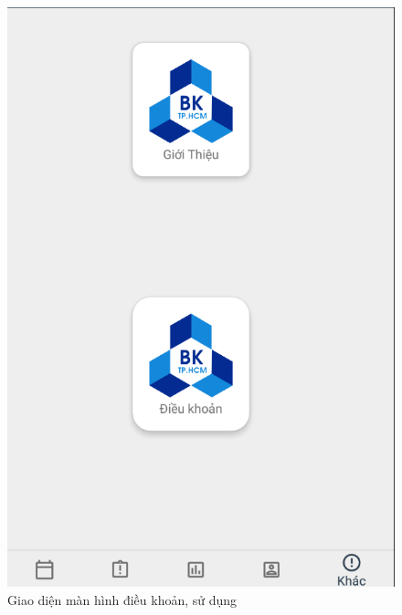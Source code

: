 \documentclass[a4paper]{article}
\begin{document}
\begin{figure}[H]
    \centering
    \includegraphics[scale=.4]{other_ui.png}
    \caption{Giao diện màn hình điều khoản, sử dụng}

\end{figure}
\end{document}
